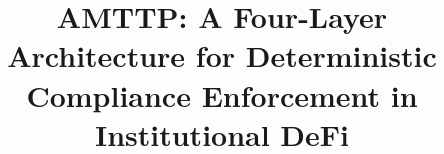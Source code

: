 \documentclass[journal]{IEEEtran}
\begin{document}
\title{AMTTP: A Four-Layer Architecture for Deterministic Compliance Enforcement in Institutional DeFi}

\author{
}

\maketitle

\end{document}

